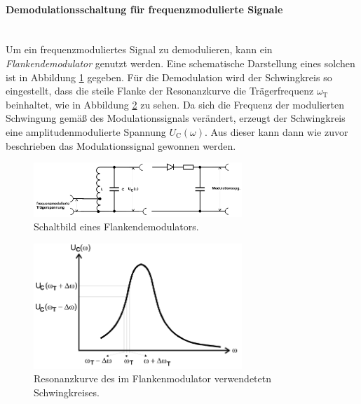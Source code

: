 \FloatBarrier

\paragraph{Demodulationsschaltung für frequenzmodulierte Signale}
\mbox{}\\
Um ein frequenzmoduliertes Signal zu demodulieren, kann ein
\textit{Flankendemodulator} genutzt werden.
Eine schematische Darstellung eines solchen ist in Abbildung \ref{fig:11}
gegeben. Für die Demodulation wird der Schwingkreis so eingestellt, dass
die steile Flanke der Resonanzkurve die Trägerfrequenz $\omega_{\text{T}}$ beinhaltet, wie in Abbildung \ref{fig:12} zu sehen.
Da sich die Frequenz der modulierten Schwingung gemäß des Modulationssignals
verändert, erzeugt der Schwingkreis eine amplitudenmodulierte Spannung
$U_{\text{C}}(\omega)$. Aus dieser kann dann wie zuvor beschrieben das
Modulationssignal gewonnen werden.

\begin{figure}
\centering
\includegraphics[width=0.7\textwidth]{figures/flankenmodulator.PNG}
\caption{Schaltbild eines Flankendemodulators.\cite{sample}}
\label{fig:11}
\end{figure}

\begin{figure}
\centering
\includegraphics[width=0.7\textwidth]{figures/resonanzkurve.PNG}
\caption{Resonanzkurve des im Flankenmodulator verwendetetn Schwingkreises.\cite{sample}}
\label{fig:12}
\end{figure}
